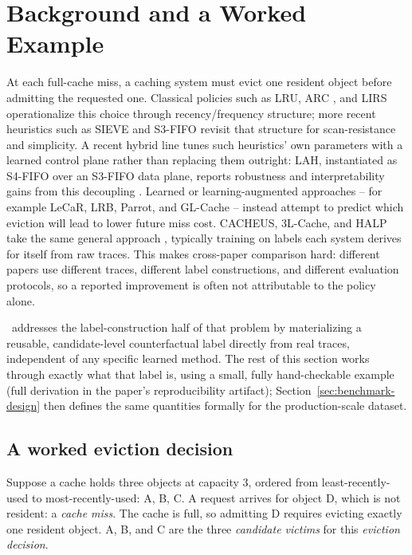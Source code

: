 \section{Background and a Worked Example}
\label{sec:background}

At each full-cache miss, a caching system must evict one resident object
before admitting the requested one. Classical policies such as LRU, ARC
\cite{megiddo2003arc}, and LIRS \cite{jiang2002lirs} operationalize this
choice through recency/frequency structure; more recent heuristics such as
SIEVE \cite{zhang2024sieve} and S3-FIFO \cite{yang2023s3fifo} revisit that
structure for scan-resistance and simplicity. A recent hybrid line tunes
such heuristics' own parameters with a learned control plane rather than
replacing them outright: LAH, instantiated as S4-FIFO over an S3-FIFO data
plane, reports robustness and interpretability gains from this
decoupling \cite{xia2026lah}. Learned or learning-augmented approaches -- for example LeCaR, LRB,
Parrot, and GL-Cache \cite{vietri2018lecar,song2020lrb,liu2020parrot,yang2023glcache}
-- instead attempt to predict which eviction will lead to lower future
miss cost. CACHEUS, 3L-Cache, and HALP take the same general approach
\cite{rodriguez2021cacheus,zhou2025threelcache,song2023halp}, typically
training on labels each system derives for itself from raw traces. This makes cross-paper comparison hard:
different papers use different traces, different label constructions, and
different evaluation protocols, so a reported improvement is often not
attributable to the policy alone.

\lafc\ addresses the label-construction half of that problem by
materializing a reusable, candidate-level counterfactual label directly
from real traces, independent of any specific learned method. The rest of
this section works through exactly what that label is, using a small,
fully hand-checkable example (full derivation in the paper's
reproducibility artifact); Section~\ref{sec:benchmark-design} then defines
the same quantities formally for the production-scale dataset.

\subsection{A worked eviction decision}

Suppose a cache holds three objects at capacity 3, ordered from
least-recently-used to most-recently-used: A, B, C. A request arrives for
object D, which is not resident: a \emph{cache miss}. The cache is full,
so admitting D requires evicting exactly one resident object. A, B, and C
are the three \emph{candidate victims} for this \emph{eviction decision}.

